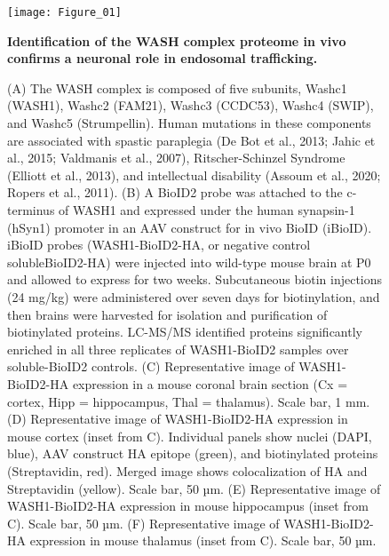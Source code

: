 \begin{figure}[!ht]
	\begin{fullwidth}
	\begin{center}
	\captionsetup{labelformat=empty}
	\texttt{[image: Figure\_01]}
	\caption{\textbf{Identification of the WASH complex proteome in vivo confirms a
		neuronal role in endosomal trafficking.}}
	\end{center}
	\end{fullwidth}
\end{figure}

\begin{figure}[!ht]
	\begin{fullwidth}
	\begin{center}
	\captionsetup{labelformat=adja-page}
	\ContinuedFloat
	\caption{
		(A) The WASH complex is composed of five subunits, Washc1 (WASH1), Washc2
		(FAM21), Washc3 (CCDC53), Washc4 (SWIP), and Washc5 (Strumpellin). Human
		mutations in these components are associated with spastic paraplegia (De Bot et
		al., 2013; Jahic et al., 2015; Valdmanis et al., 2007), Ritscher-Schinzel
		Syndrome (Elliott et al., 2013), and intellectual disability (Assoum et al.,
		2020; Ropers et al., 2011). 
		(B) A BioID2 probe was attached to the c-terminus of WASH1 and expressed under
		the human synapsin-1 (hSyn1) promoter in an AAV construct for in vivo BioID
		(iBioID). iBioID probes (WASH1-BioID2-HA, or negative control solubleBioID2-HA)
		were injected into wild-type mouse brain at P0 and allowed to express for two
		weeks. Subcutaneous biotin injections (24 mg/kg) were administered over seven
		days for biotinylation, and then brains were harvested for isolation and
		purification of biotinylated proteins. LC-MS/MS identified proteins
		significantly enriched in all three replicates of WASH1-BioID2 samples over
		soluble-BioID2 controls. 
		(C) Representative image of WASH1-BioID2-HA expression in a mouse coronal brain
		section (Cx = cortex, Hipp = hippocampus, Thal = thalamus). Scale bar, 1 mm.
		(D) Representative image of WASH1-BioID2-HA expression in mouse cortex (inset
		from C). Individual panels show nuclei (DAPI, blue), AAV construct HA epitope
		(green), and biotinylated proteins (Streptavidin, red). Merged image shows
		colocalization of HA and Streptavidin (yellow). Scale bar, 50 µm. 
		(E) Representative image of WASH1-BioID2-HA expression in mouse hippocampus
		(inset from C). Scale bar, 50 µm.
		(F) Representative image of WASH1-BioID2-HA expression in mouse thalamus (inset
		from C). Scale bar, 50 µm.
}
\end{center}
\end{fullwidth}
\end{figure}
